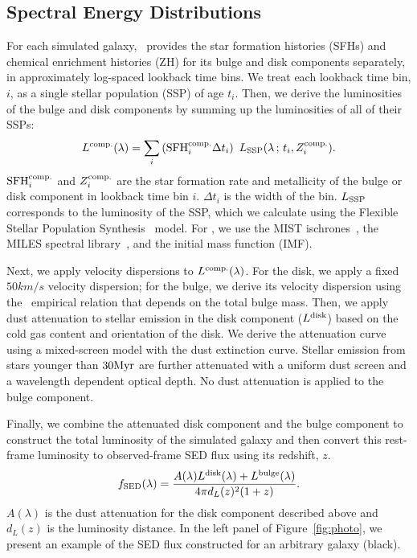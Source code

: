 \subsection{Spectral Energy Distributions} \label{sec:sed}
For each simulated galaxy, \lgal~provides the star formation histories (SFHs)
and chemical enrichment histories (ZH) for its bulge and disk components
separately, in approximately log-spaced lookback time bins. %
We treat each lookback time bin, $i$, as a single stellar population (SSP) of
age $t_i$.
Then, we derive the luminosities of the bulge and disk components by summing up
the luminosities of all of their SSPs:
\begin{equation}
    L^{\rm comp.}(\lambda) = \sum \limits_i \left({\rm SFH}^{\rm comp.}_i
    \Delta t_i\right)~L_{\rm SSP}(\lambda\,;\, t_i, Z^{\rm comp.}_i). 
\end{equation}
${\rm SFH}^{\rm comp.}_i$ and $Z^{\rm comp.}_i$ are the star formation rate and
metallicity of the bulge or disk component in lookback time bin $i$. 
$\Delta t_i$ is the width of the bin. 
$L_{\rm SSP}$ corresponds to the luminosity of the SSP, which we calculate
using the Flexible Stellar Population Synthesis~\citep[\fsps][]{conroy2009,
conroy2010c} model.
For \fsps, we use the MIST ischrones~\citep{paxton2011, paxton2013, paxton2015,
choi2016, dotter2016}, the MILES spectral library~\citep{sanchez_blazquez2006},
and the \cite{chabrier2003} initial mass function (IMF). 

Next, we apply velocity dispersions to $L^{\rm comp.}(\lambda)$.
For the disk, we apply a fixed $50 km/s$ velocity dispersion; for the bulge, we
derive its velocity dispersion using the~\cite{zahid2016} empirical relation
that depends on the total bulge mass.
Then, we apply dust attenuation to stellar emission in the disk component
($L^{\rm disk}$) based on the cold gas content and orientation of the disk. 
We derive the attenuation curve using a mixed-screen model with the
\cite{mathis1983} dust extinction curve. 
Stellar emission from stars younger than $30{\rm Myr}$ are further attenuated
with a uniform dust screen and a wavelength dependent optical depth.
No dust attenuation is applied to the bulge component.

Finally, we combine the attenuated disk component and the bulge component to
construct the total luminosity of the simulated galaxy and then convert this
rest-frame luminosity to observed-frame SED flux using its redshift, $z$.
\begin{equation}\label{eq:sed} 
    f_{\rm SED}(\lambda) = \frac{A(\lambda)L^{\rm disk}(\lambda) + L^{\rm bulge}(\lambda)}{4 \pi d_L(z)^2 (1+z)}.
\end{equation}
$A(\lambda)$ is the dust attenuation for the disk component described above 
and $d_L(z)$ is the luminosity distance.
In the left panel of Figure~\ref{fig:photo}, we present an example of the SED
flux constructed for an arbitrary \lgal galaxy (black).

